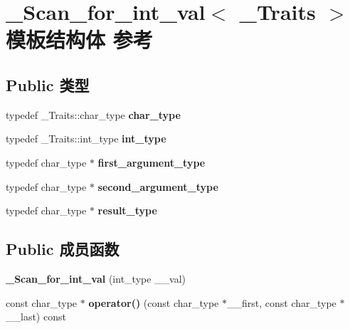 \hypertarget{struct___scan__for__int__val}{}\section{\+\_\+\+Scan\+\_\+for\+\_\+int\+\_\+val$<$ \+\_\+\+Traits $>$ 模板结构体 参考}
\label{struct___scan__for__int__val}
\subsection*{Public 类型}
\begin{DoxyCompactItemize}
\item 
\mbox{\label{struct___scan__for__int__val_a2f4222da7f3caec950ddec3fc87eefa2}} 
typedef \+\_\+\+Traits\+::char\+\_\+type {\bfseries char\+\_\+type}
\item 
\mbox{\label{struct___scan__for__int__val_a19a19525d078d8167f3bab6e2b1c679f}} 
typedef \+\_\+\+Traits\+::int\+\_\+type {\bfseries int\+\_\+type}
\item 
\mbox{\label{struct___scan__for__int__val_a50db77370bc226358908def90fee982f}} 
typedef char\+\_\+type $\ast$ {\bfseries first\+\_\+argument\+\_\+type}
\item 
\mbox{\label{struct___scan__for__int__val_a040a5d356b3d299c2dffbe32345636fd}} 
typedef char\+\_\+type $\ast$ {\bfseries second\+\_\+argument\+\_\+type}
\item 
\mbox{\label{struct___scan__for__int__val_a7cc80d34649823e3b730e2161f83bff4}} 
typedef char\+\_\+type $\ast$ {\bfseries result\+\_\+type}
\end{DoxyCompactItemize}
\subsection*{Public 成员函数}
\begin{DoxyCompactItemize}
\item 
\mbox{\label{struct___scan__for__int__val_a15346b0a4946d3c636935778ff96a117}} 
{\bfseries \+\_\+\+Scan\+\_\+for\+\_\+int\+\_\+val} (int\+\_\+type \+\_\+\+\_\+val)
\item 
\mbox{\label{struct___scan__for__int__val_adfcad8d53aaa1bcdf1a8a651c51053f7}} 
const char\+\_\+type $\ast$ {\bfseries operator()} (const char\+\_\+type $\ast$\+\_\+\+\_\+first, const char\+\_\+type $\ast$\+\_\+\+\_\+last) const
\end{DoxyCompactItemize}
